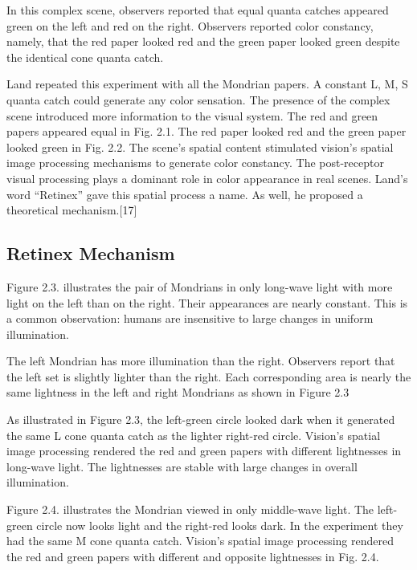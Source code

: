 In this complex scene, observers reported that equal quanta catches appeared green on the left and red on the right. Observers reported color constancy, namely, that the red paper looked red and the green paper looked green despite the identical cone quanta catch.

Land repeated this experiment with all the Mondrian papers. A constant L, M, S quanta catch could generate any color sensation. The presence of the complex scene introduced more information to the visual system. The red and green papers appeared equal in Fig. 2.1. The red paper looked red and the green paper looked green in Fig. 2.2. The scene’s spatial content stimulated vision’s spatial image processing mechanisms to generate color constancy. The post-receptor visual processing plays a dominant role in color appearance in real scenes. Land’s word “Retinex” gave this spatial process a name. As well, he proposed a theoretical mechanism.[17]

\subsection{Retinex Mechanism}
Figure 2.3. illustrates the pair of Mondrians in only long-wave light with more light on the left than on the right. Their appearances are nearly constant. This is a common observation: humans are insensitive to large changes in uniform illumination.


The left Mondrian has more illumination than the right. Observers report that the left set is slightly lighter than the right. Each corresponding area is nearly the same lightness in the left and right Mondrians as shown in Figure 2.3

As illustrated in Figure 2.3, the left-green circle looked dark when it generated the same L cone quanta catch as the lighter right-red circle. Vision’s spatial image processing rendered the red and green papers with different lightnesses in long-wave light. The lightnesses are stable with large changes in overall illumination.

Figure 2.4. illustrates the Mondrian viewed in only middle-wave light. The left-green circle now looks light and the right-red looks dark. In the experiment they had the same M cone quanta catch. Vision’s spatial image processing rendered the red and green papers with different and opposite lightnesses in Fig. 2.4.

